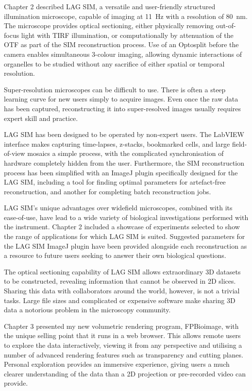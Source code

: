Chapter 2 described LAG SIM, a versatile and user-friendly structured illumination microscope, capable of imaging at \SI{11}{\hertz} with a resolution of \SI{80}{\nano\metre}. 
The microscope provides optical sectioning, either physically removing out-of-focus light with TIRF illumination, or computationally by attenuation of the OTF as part of the SIM reconstruction process. 
Use of an Optosplit before the camera enables simultaneous 3-colour imaging, allowing dynamic interactions of organelles to be studied without any sacrifice of either spatial or temporal resolution.

Super-resolution microscopes can be difficult to use.
There is often a steep learning curve for new users simply to acquire images. 
Even once the raw data has been captured, reconstructing it into super-resolved images usually requires expert skill and practice. 

LAG SIM has been designed to be operated by non-expert users. 
The LabVIEW interface makes capturing time-lapses, z-stacks, bookmarked cells, and large field-of-view mosaics a simple process, with the complicated synchronisation of hardware completely hidden from the user. 
Furthermore, the SIM reconstruction process has been simplified with an ImageJ plugin specifically designed for the LAG SIM, including a tool for finding optimal parameters for artefact-free reconstruction, and another for completing batch reconstruction jobs. 

LAG SIM's unique advantages over widefield microscopes, combined with its ease-of-use, have lead to a wide variety of biological investigations performed with the instrument. 
Chapter 2 included a showcase of experiments selected to show the range of applications for which LAG SIM is suited. 
Suggested parameters for the LAG SIM ImageJ plugin have been provided alongside each reconstruction as a resource to future users seeking to answer their own biological questions. 

The optical sectioning capability of LAG SIM allows extraordinary 3D datasets to be constructed, revealing information that cannot be observed in 2D slices. 
Sharing this data with collaborators around the world, however, is not a trivial tasks.
Large file sizes and complicated or expensive software make sharing 3D data a notorious problem in the microscopy community. 

Chapter 3 presented my new volumetric rendering program, FPBioimage, with the unique selling point that it runs in a web browser.
This allows remote users to explore the data interactively, viewing it from any perspective and utilising a number of advanced rendering features such as transparency and cutting planes. 
Personal exploration provides an immersive experience, giving users a much clearer understanding of the data than a 2D projection or pre-recorded video can provide. 

